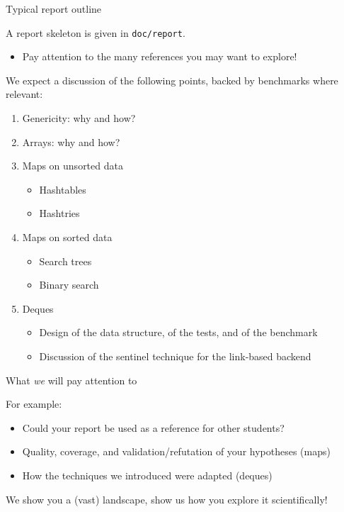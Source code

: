 \begin{frame}[fragile]{Typical report outline}

  A report skeleton is given in \lstinline{doc/report}.
  \begin{itemize}
  \item Pay attention to the many references you may want to explore!
  \end{itemize}

  We expect a discussion of the following points, backed by benchmarks where relevant:
  \begin{enumerate}
  \item Genericity: why and how?
  \item Arrays: why and how?
  \item Maps on unsorted data
    \begin{itemize}
    \item Hashtables
    \item Hashtries
    \end{itemize}
  \item Maps on sorted data
    \begin{itemize}
    \item Search trees
    \item Binary search
    \end{itemize}
  \item Deques
    \begin{itemize}
    \item Design of the data structure, of the tests, and of the benchmark
    \item Discussion of the sentinel technique for the link-based backend
    \end{itemize}
  \end{enumerate}

\end{frame}


\begin{frame}[fragile]{What {\em we} will pay attention to}

  For example: 
  \begin{itemize}
  \item Could your report be used as a reference for other students?
  \item Quality, coverage, and validation/refutation of your hypotheses (maps)
  \item How the techniques we introduced were adapted (deques)
  \end{itemize}

  We show you a (vast) landscape, show us how you explore it scientifically!
  
\end{frame}



